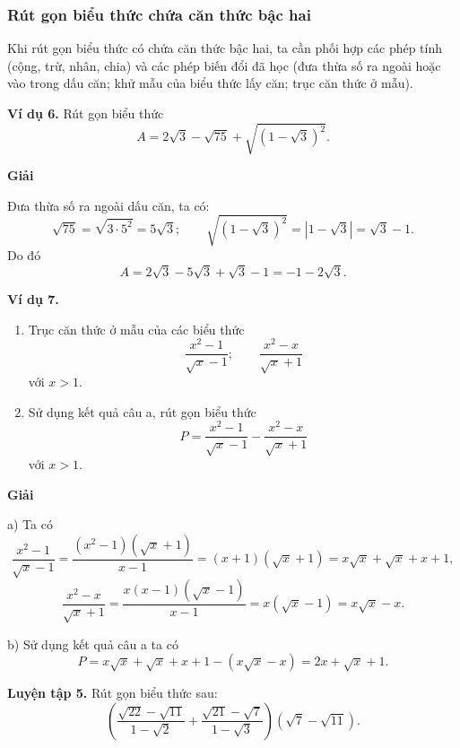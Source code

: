 \begin{lesson}
    \answerline
    \answerline

    \subsubsection{Rút gọn biểu thức chứa căn thức bậc hai}

    Khi rút gọn biểu thức có chứa căn thức bậc hai, ta cần phối hợp các phép tính (cộng, trừ, nhân, chia) và các phép biến đổi đã học (đưa thừa số ra ngoài hoặc vào trong dấu căn; khử mẫu của biểu thức lấy căn; trục căn thức ở mẫu).

    \textbf{Ví dụ 6.} Rút gọn biểu thức
    \[
        A=2\sqrt3-\sqrt{75}+\sqrt{(1-\sqrt3)^2}.
    \]

    \textbf{Giải}

    Đưa thừa số ra ngoài dấu căn, ta có:
    \[
        \sqrt{75}=\sqrt{3\cdot5^2}=5\sqrt3;
        \qquad
        \sqrt{(1-\sqrt3)^2}=|1-\sqrt3|=\sqrt3-1.
    \]
    Do đó
    \[
        A=2\sqrt3-5\sqrt3+\sqrt3-1=-1-2\sqrt3.
    \]

    \textbf{Ví dụ 7.}
    \begin{enumerate}[label=\alph*)]
        \item Trục căn thức ở mẫu của các biểu thức
        \[
            \dfrac{x^2-1}{\sqrt x-1};
            \qquad
            \dfrac{x^2-x}{\sqrt x+1}
        \]
        với $x>1$.
        \item Sử dụng kết quả câu a, rút gọn biểu thức
        \[
            P=\dfrac{x^2-1}{\sqrt x-1}-\dfrac{x^2-x}{\sqrt x+1}
        \]
        với $x>1$.
    \end{enumerate}

    \textbf{Giải}

    a) Ta có
    \[
        \dfrac{x^2-1}{\sqrt x-1}
        =\dfrac{(x^2-1)(\sqrt x+1)}{x-1}
        =(x+1)(\sqrt x+1)
        =x\sqrt x+\sqrt x+x+1,
    \]
    \[
        \dfrac{x^2-x}{\sqrt x+1}
        =\dfrac{x(x-1)(\sqrt x-1)}{x-1}
        =x(\sqrt x-1)
        =x\sqrt x-x.
    \]

    b) Sử dụng kết quả câu a ta có
    \[
        P=x\sqrt x+\sqrt x+x+1-(x\sqrt x-x)
        =2x+\sqrt x+1.
    \]

    \textbf{Luyện tập 5.} Rút gọn biểu thức sau:
    \[
        \left(
            \dfrac{\sqrt{22}-\sqrt{11}}{1-\sqrt2}
            +\dfrac{\sqrt{21}-\sqrt7}{1-\sqrt3}
        \right)(\sqrt7-\sqrt{11}).
    \]

    \answerline
    \answerline


\end{lesson}
